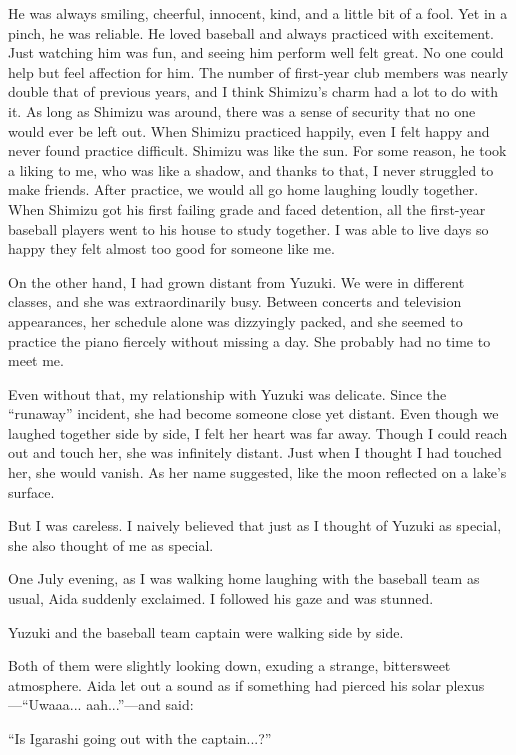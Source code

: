 \documentclass[
    a4paper,
    12pt,
    twoside,
    openany,
    UTF8,
    fontset=windows
]{ctexbook}
\begin{document}
He was always smiling, cheerful, innocent, kind, and a little bit of a fool. Yet in a pinch, he was reliable. He loved baseball and always practiced with excitement. Just watching him was fun, and seeing him perform well felt great. No one could help but feel affection for him. The number of first-year club members was nearly double that of previous years, and I think Shimizu's charm had a lot to do with it. As long as Shimizu was around, there was a sense of security that no one would ever be left out. When Shimizu practiced happily, even I felt happy and never found practice difficult. Shimizu was like the sun. For some reason, he took a liking to me, who was like a shadow, and thanks to that, I never struggled to make friends. After practice, we would all go home laughing loudly together. When Shimizu got his first failing grade and faced detention, all the first-year baseball players went to his house to study together. I was able to live days so happy they felt almost too good for someone like me.

On the other hand, I had grown distant from Yuzuki. We were in different classes, and she was extraordinarily busy. Between concerts and television appearances, her schedule alone was dizzyingly packed, and she seemed to practice the piano fiercely without missing a day. She probably had no time to meet me.

Even without that, my relationship with Yuzuki was delicate. Since the ``runaway'' incident, she had become someone close yet distant. Even though we laughed together side by side, I felt her heart was far away. Though I could reach out and touch her, she was infinitely distant. Just when I thought I had touched her, she would vanish. As her name suggested, like the moon reflected on a lake's surface.

But I was careless. I naively believed that just as I thought of Yuzuki as special, she also thought of me as special.

One July evening, as I was walking home laughing with the baseball team as usual, Aida suddenly exclaimed. I followed his gaze and was stunned.

Yuzuki and the baseball team captain were walking side by side.

Both of them were slightly looking down, exuding a strange, bittersweet atmosphere. Aida let out a sound as if something had pierced his solar plexus---``Uwaaa... aah...''---and said:

``Is Igarashi going out with the captain...?''
\end{document}
